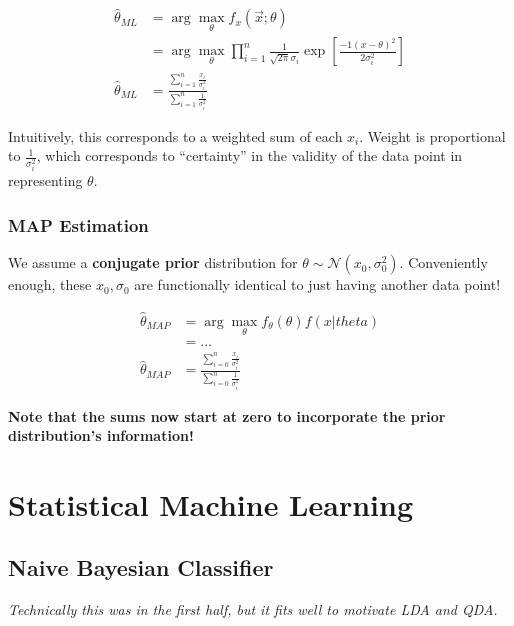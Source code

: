 \documentclass[a4paper,12pt]{report}
\begin{document}
\begin{equation}
\begin{split}
\hat \theta_{ML} &= \arg\max_{\theta} f_x(\vec x ; \theta) \\
&= \arg\max_\theta \prod_{i= 1}^n \frac{1}{\sqrt{2\pi} \sigma_i} \exp[\frac{-1(x-\theta)^2}{2\sigma_i^2}] \\
\hat \theta_{ML} &= \frac{\sum_{i=1}^{n} \frac{x_i}{\sigma_i^2}}{\sum_{i=1}^{n} \frac{1}{\sigma_i^2}}
\end{split}
\end{equation}

Intuitively, this corresponds to a weighted sum of each $x_i$. Weight is proportional to $\frac{1 }{\sigma_i^2}$, which corresponds to ``certainty'' in the validity of the data point in representing $\theta$.

\subsection{MAP Estimation}

We assume a \textbf{conjugate prior} distribution for $\theta \sim \mathcal N(x_0, \sigma_0^2)$. Conveniently enough, these $x_0, \sigma_0$ are functionally identical to just having another data point!

\begin{equation}
\begin{split}
\hat \theta_{MAP} &= \arg\max_{\theta} f_{\theta}(\theta) f(x | theta) \\
&= \dots \\
\hat \theta_{MAP} &= \frac{\sum_{i=0}^{n} \frac{x_i}{\sigma_i^2}}{\sum_{i=0}^{n} \frac{1}{\sigma_i^2}} 
\end{split}
\end{equation}

\textbf{Note that the sums now start at zero to incorporate the prior distribution's information!} 



\chapter{Statistical Machine Learning}

\section{Naive Bayesian Classifier}

\textit{Technically this was in the first half, but it fits well to motivate LDA and QDA.} 
\end{document}

